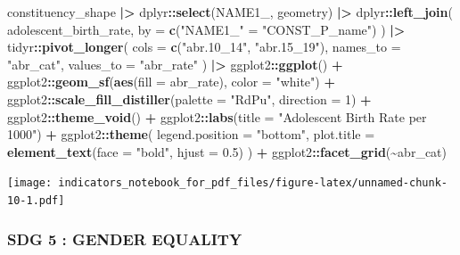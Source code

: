 \documentclass[
]{article}
\newenvironment{Shaded}{\begin{snugshade}}{\end{snugshade}}
\newcommand{\AttributeTok}[1]{\textcolor[rgb]{0.13,0.29,0.53}{#1}}
\newcommand{\DecValTok}[1]{\textcolor[rgb]{0.00,0.00,0.81}{#1}}
\newcommand{\FloatTok}[1]{\textcolor[rgb]{0.00,0.00,0.81}{#1}}
\newcommand{\FunctionTok}[1]{\textcolor[rgb]{0.13,0.29,0.53}{\textbf{#1}}}
\newcommand{\NormalTok}[1]{#1}
\newcommand{\OtherTok}[1]{\textcolor[rgb]{0.56,0.35,0.01}{#1}}
\newcommand{\SpecialCharTok}[1]{\textcolor[rgb]{0.81,0.36,0.00}{\textbf{#1}}}
\newcommand{\StringTok}[1]{\textcolor[rgb]{0.31,0.60,0.02}{#1}}
\newenvironment{UNFPAShadedBox}{%
\begin{tcolorbox}[sharp corners, enhanced, colback=white, boxrule=0pt, borderline west={2pt}{0pt}{orange}]%
}{\end{tcolorbox}}
\newenvironment{Highlighting}{\begin{UNFPAShadedBox}}{\end{UNFPAShadedBox}}
\begin{document}
\begin{Shaded}
\begin{Highlighting}[]
\NormalTok{constituency\_shape }\SpecialCharTok{|\textgreater{}}
\NormalTok{  dplyr}\SpecialCharTok{::}\FunctionTok{select}\NormalTok{(NAME1\_, geometry) }\SpecialCharTok{|\textgreater{}}
\NormalTok{  dplyr}\SpecialCharTok{::}\FunctionTok{left\_join}\NormalTok{(}
\NormalTok{    adolescent\_birth\_rate,}
    \AttributeTok{by =} \FunctionTok{c}\NormalTok{(}\StringTok{"NAME1\_"} \OtherTok{=} \StringTok{"CONST\_P\_name"}\NormalTok{)}
\NormalTok{  ) }\SpecialCharTok{|\textgreater{}}
\NormalTok{  tidyr}\SpecialCharTok{::}\FunctionTok{pivot\_longer}\NormalTok{(}
    \AttributeTok{cols =} \FunctionTok{c}\NormalTok{(}\StringTok{"abr.10\_14"}\NormalTok{, }\StringTok{"abr.15\_19"}\NormalTok{),}
    \AttributeTok{names\_to =} \StringTok{"abr\_cat"}\NormalTok{,}
    \AttributeTok{values\_to =} \StringTok{"abr\_rate"}
\NormalTok{  ) }\SpecialCharTok{|\textgreater{}}
\NormalTok{  ggplot2}\SpecialCharTok{::}\FunctionTok{ggplot}\NormalTok{() }\SpecialCharTok{+}
\NormalTok{  ggplot2}\SpecialCharTok{::}\FunctionTok{geom\_sf}\NormalTok{(}\FunctionTok{aes}\NormalTok{(}\AttributeTok{fill =}\NormalTok{ abr\_rate), }\AttributeTok{color =} \StringTok{"white"}\NormalTok{) }\SpecialCharTok{+}
\NormalTok{  ggplot2}\SpecialCharTok{::}\FunctionTok{scale\_fill\_distiller}\NormalTok{(}\AttributeTok{palette =} \StringTok{"RdPu"}\NormalTok{, }\AttributeTok{direction =} \DecValTok{1}\NormalTok{) }\SpecialCharTok{+}
\NormalTok{  ggplot2}\SpecialCharTok{::}\FunctionTok{theme\_void}\NormalTok{() }\SpecialCharTok{+}
\NormalTok{  ggplot2}\SpecialCharTok{::}\FunctionTok{labs}\NormalTok{(}\AttributeTok{title =} \StringTok{"Adolescent Birth Rate per 1000"}\NormalTok{) }\SpecialCharTok{+}
\NormalTok{  ggplot2}\SpecialCharTok{::}\FunctionTok{theme}\NormalTok{(}
    \AttributeTok{legend.position =} \StringTok{"bottom"}\NormalTok{,}
    \AttributeTok{plot.title =} \FunctionTok{element\_text}\NormalTok{(}\AttributeTok{face =} \StringTok{"bold"}\NormalTok{, }\AttributeTok{hjust =} \FloatTok{0.5}\NormalTok{)}
\NormalTok{  ) }\SpecialCharTok{+}
\NormalTok{  ggplot2}\SpecialCharTok{::}\FunctionTok{facet\_grid}\NormalTok{(}\SpecialCharTok{\textasciitilde{}}\NormalTok{abr\_cat)}
\end{Highlighting}
\end{Shaded}

\texttt{[image: indicators\_notebook\_for\_pdf\_files/figure-latex/unnamed-chunk-10-1.pdf]}

\subsubsection{SDG 5 : GENDER EQUALITY}\label{sdg-5-gender-equality}
\end{document}
